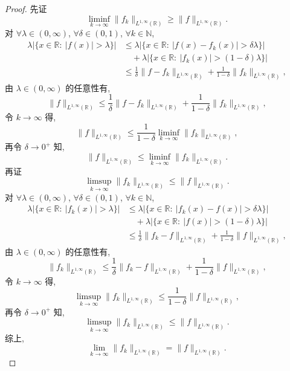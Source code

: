 \documentclass[a4paper,11pt]{article}
\theoremstyle{definition}
\begin{document}
\begin{CJK*}{UTF8}{gbsn}
\begin{proof}
    先证
    $$
        \liminf_{k \to \infty} \| f_k \|_{L^{1, \infty}(\mathbb{R})}
            \geq \| f \|_{L^{1, \infty}(\mathbb{R})}.
    $$
    对 $ \forall \lambda \in (0, \infty) $, $ \forall \delta \in (0, 1) $, $ \forall k \in \mathbb{N} $,
    \begin{align*}
        \lambda |\{ x \in \mathbb{R} :\ |f(x)| > \lambda \}|
            &\leq \lambda |\{ x \in \mathbb{R} :\ |f(x) - f_k(x)| > \delta\lambda \}| \\
                &\quad + \lambda |\{ x \in \mathbb{R} :\ |f_k(x)| > (1 - \delta)\lambda \}| \\
            &\leq \frac{1}{\delta} \| f - f_k \|_{L^{1, \infty}(\mathbb{R})}
                + \frac{1}{1 - \delta} \| f_k \|_{L^{1, \infty}(\mathbb{R})},
    \end{align*}
    由 $ \lambda \in (0, \infty) $ 的任意性有,
    $$
        \| f \|_{L^{1, \infty}(\mathbb{R})}
            \leq \frac{1}{\delta} \| f - f_k \|_{L^{1, \infty}(\mathbb{R})}
                + \frac{1}{1 - \delta} \| f_k \|_{L^{1, \infty}(\mathbb{R})},
    $$
    令 $ k \to \infty $ 得,
    $$
        \| f \|_{L^{1, \infty}(\mathbb{R})}
            \leq \frac{1}{1 - \delta} \liminf_{k \to \infty} \| f_k \|_{L^{1, \infty}(\mathbb{R})},
    $$
    再令 $ \delta \to 0^+ $ 知,
    $$
        \| f \|_{L^{1, \infty}(\mathbb{R})}
            \leq \liminf_{k \to \infty} \| f_k \|_{L^{1, \infty}(\mathbb{R})}.
    $$
    再证
    $$
        \limsup_{k \to \infty} \| f_k \|_{L^{1, \infty}(\mathbb{R})}
            \leq \| f \|_{L^{1, \infty}(\mathbb{R})}.
    $$
    对 $ \forall \lambda \in (0, \infty) $, $ \forall \delta \in (0, 1) $, $ \forall k \in \mathbb{N} $,
    \begin{align*}
        \lambda |\{ x \in \mathbb{R} :\ |f_k(x)| > \lambda \}|
            &\leq \lambda |\{ x \in \mathbb{R} :\ |f_k(x) - f(x)| > \delta\lambda \}| \\
                &\quad + \lambda |\{ x \in \mathbb{R} :\ |f(x)| > (1 - \delta)\lambda \}| \\
            &\leq \frac{1}{\delta} \| f_k - f \|_{L^{1, \infty}(\mathbb{R})}
                + \frac{1}{1 - \delta} \| f \|_{L^{1, \infty}(\mathbb{R})},
    \end{align*}
    由 $ \lambda \in (0, \infty) $ 的任意性有,
    $$
        \| f_k \|_{L^{1, \infty}(\mathbb{R})}
            \leq \frac{1}{\delta} \| f_k - f \|_{L^{1, \infty}(\mathbb{R})}
                + \frac{1}{1 - \delta} \| f \|_{L^{1, \infty}(\mathbb{R})},
    $$
    令 $ k \to \infty $ 得,
    $$
        \limsup_{k \to \infty} \| f_k \|_{L^{1, \infty}(\mathbb{R})}
            \leq \frac{1}{1 - \delta} \| f \|_{L^{1, \infty}(\mathbb{R})},
    $$
    再令 $ \delta \to 0^+ $ 知,
    $$
        \limsup_{k \to \infty} \| f_k \|_{L^{1, \infty}(\mathbb{R})}
            \leq \| f \|_{L^{1, \infty}(\mathbb{R})}.
    $$
    综上,
    $$
        \lim_{k \to \infty} \| f_k \|_{L^{1, \infty}(\mathbb{R})}
            = \| f \|_{L^{1, \infty}(\mathbb{R})}.
    $$
\end{proof}

\end{CJK*}
\end{document}
